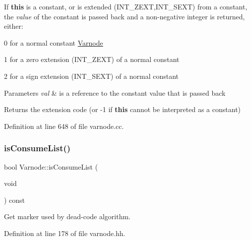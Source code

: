 If {\bfseries{this}} is a constant, or is extended (I\+N\+T\+\_\+\+Z\+E\+XT,I\+N\+T\+\_\+\+S\+E\+XT) from a constant, the {\itshape value} of the constant is passed back and a non-\/negative integer is returned, either\+:
\begin{DoxyItemize}
\item 0 for a normal constant \mbox{\hyperlink{class_varnode}{Varnode}}
\item 1 for a zero extension (I\+N\+T\+\_\+\+Z\+E\+XT) of a normal constant
\item 2 for a sign extension (I\+N\+T\+\_\+\+S\+E\+XT) of a normal constant 
\begin{DoxyParams}{Parameters}
{\em val} & is a reference to the constant value that is passed back \\
\hline
\end{DoxyParams}
\begin{DoxyReturn}{Returns}
the extension code (or -\/1 if {\bfseries{this}} cannot be interpreted as a constant) 
\end{DoxyReturn}

\end{DoxyItemize}

Definition at line 648 of file varnode.\+cc.

\mbox{\label{class_varnode_a18e8215dbe1ec41e782276e4c3947b6d}} 
\subsubsection{\texorpdfstring{isConsumeList()}{isConsumeList()}}
{\footnotesize\ttfamily bool Varnode\+::is\+Consume\+List (\begin{DoxyParamCaption}\item[{void}]{ }\end{DoxyParamCaption}) const\hspace{0.3cm}{\ttfamily [inline]}}



Get marker used by dead-\/code algorithm. 



Definition at line 178 of file varnode.\+hh.

\mbox{\label{class_varnode_ae419a0ef231d9f94fbd5460fe24e0717}} 
